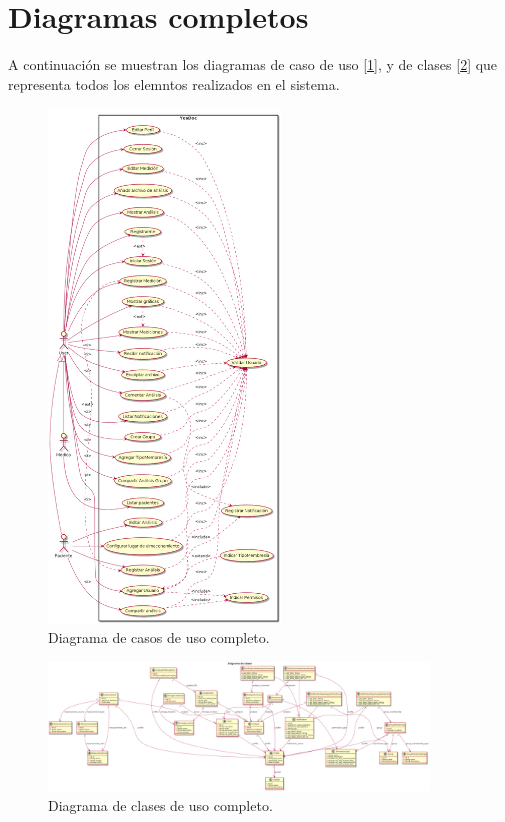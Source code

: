 \section{Diagramas completos}
A continuación se muestran los diagramas de caso de uso [\ref{dcu-full}], y de clases [\ref{dc_full}] que representa todos los elemntos realizados en el sistema.


\begin{figure}[h]
	\centering
	\includegraphics[width=0.55\textwidth]{img/dcu_final}
	\caption{Diagrama de casos de uso completo.}
	\label{dcu-full}
	\end{figure}
	


	\begin{figure}
		\centering
		\includegraphics[width=0.9\textwidth]{img/dc_full}
		\caption{Diagrama de clases de uso completo.}
		\label{dc_full}
	\end{figure}